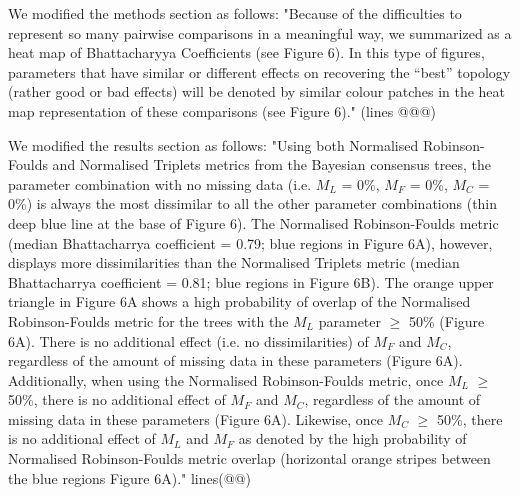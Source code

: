 \documentclass[12pt,letterpaper]{article}
\begin{document}
\begin{enumerate}
We modified the methods section as follows:
"Because of the difficulties to represent so many pairwise comparisons in a meaningful way, we summarized as a heat map of Bhattacharyya Coefficients (see Figure 6).
In this type of figures, parameters that have similar or different effects on recovering the ``best'' topology (rather good or bad effects) will be denoted by similar colour patches in the heat map representation of these comparisons (see Figure 6)." (lines @@@)

We modified the results section as follows:
"Using both Normalised Robinson-Foulds and Normalised Triplets metrics from the Bayesian consensus trees, the parameter combination with no missing data (i.e. $M_{L}$ = 0\%, $M_{F}$ = 0\%, $M_{C}$ = 0\%) is always the most dissimilar to all the other parameter combinations (thin deep blue line at the base of Figure 6).
The Normalised Robinson-Foulds metric (median Bhattacharrya coefficient = 0.79; blue regions in Figure 6A), however, displays more dissimilarities than the Normalised Triplets metric (median Bhattacharrya coefficient = 0.81; blue regions in Figure 6B).
The orange upper triangle in Figure 6A shows a high probability of overlap of the Normalised Robinson-Foulds metric for the trees with the $M_{L}$ parameter $\geq$ 50\% (Figure 6A).
There is no additional effect (i.e. no dissimilarities) of $M_{F}$ and $M_{C}$, regardless of the amount of missing data in these parameters (Figure 6A).
Additionally, when using the Normalised Robinson-Foulds metric, once $M_{L}$ $\geq$ 50\%, there is no additional effect of $M_{F}$ and $M_{C}$, regardless of the amount of missing data in these parameters (Figure 6A).
Likewise, once $M_{C}$ $\geq$ 50\%, there is no additional effect of $M_{L}$ and $M_{F}$ as denoted by the high probability of Normalised Robinson-Foulds metric overlap (horizontal orange stripes between the blue regions Figure 6A)." lines(@@)


\end{enumerate}
\end{document}
